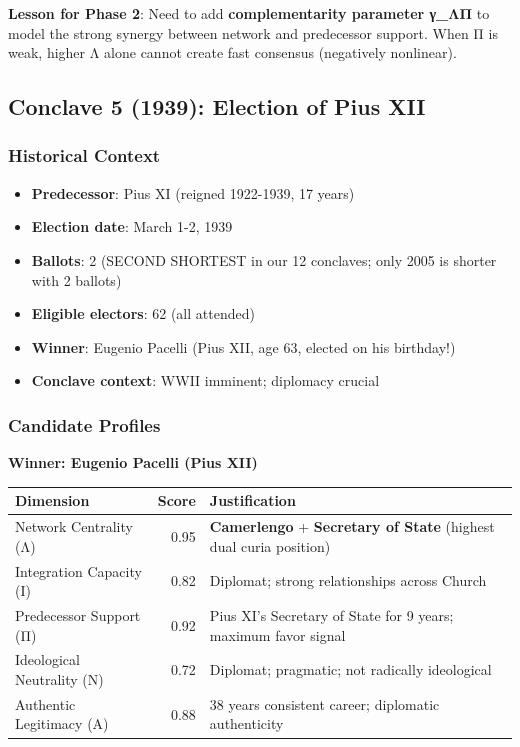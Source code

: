 \documentclass[11pt,a4paper]{article}
\begin{document}
\textbf{Lesson for Phase 2}: Need to add \textbf{complementarity parameter γ_ΛΠ} to model the strong synergy between network and predecessor support. When Π is weak, higher Λ alone cannot create fast consensus (negatively nonlinear).


\subsection{Conclave 5 (1939): Election of Pius XII}

\subsubsection{Historical Context}

\begin{itemize}
    \item \textbf{Predecessor}: Pius XI (reigned 1922-1939, 17 years)
    \item \textbf{Election date}: March 1-2, 1939
    \item \textbf{Ballots}: 2 (SECOND SHORTEST in our 12 conclaves; only 2005 is shorter with 2 ballots)
    \item \textbf{Eligible electors}: 62 (all attended)
    \item \textbf{Winner}: Eugenio Pacelli (Pius XII, age 63, elected on his birthday!)
    \item \textbf{Conclave context}: WWII imminent; diplomacy crucial
\end{itemize}

\subsubsection{Candidate Profiles}

\textbf{Winner: Eugenio Pacelli (Pius XII)}

\begin{center}
\begin{tabular}{lrp{4cm}}
\toprule
\textbf{Dimension} & \textbf{Score} & \textbf{Justification} \\
\midrule
Network Centrality (Λ) & 0.95 & \textbf{Camerlengo} + \textbf{Secretary of State} (highest dual curia position) \\
Integration Capacity (Ι) & 0.82 & Diplomat; strong relationships across Church \\
Predecessor Support (Π) & 0.92 & Pius XI's Secretary of State for 9 years; maximum favor signal \\
Ideological Neutrality (Ν) & 0.72 & Diplomat; pragmatic; not radically ideological \\
Authentic Legitimacy (Α) & 0.88 & 38 years consistent career; diplomatic authenticity \\
\bottomrule
\end{tabular}
\end{center}
\end{document}
